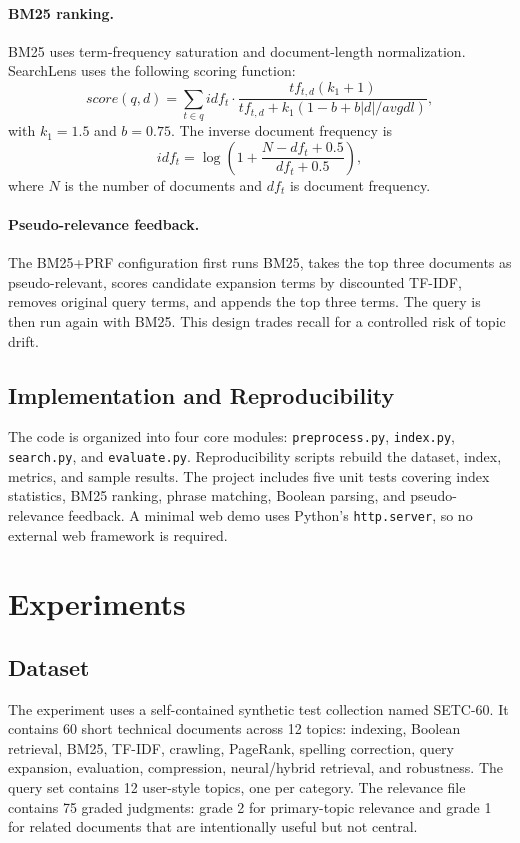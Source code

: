 \documentclass[sigconf,nonacm]{acmart}
\begin{document}
\paragraph{BM25 ranking.} BM25 uses term-frequency saturation and document-length normalization. SearchLens uses the following scoring function:
\begin{equation}
score(q,d)=\sum_{t \in q} idf_t \cdot \frac{tf_{t,d}(k_1+1)}{tf_{t,d}+k_1(1-b+b|d|/avgdl)},
\end{equation}
with $k_1=1.5$ and $b=0.75$. The inverse document frequency is
\begin{equation}
  idf_t = \log\left(1 + \frac{N - df_t + 0.5}{df_t + 0.5}\right),
\end{equation}
where $N$ is the number of documents and $df_t$ is document frequency.

\paragraph{Pseudo-relevance feedback.} The BM25+PRF configuration first runs BM25, takes the top three documents as pseudo-relevant, scores candidate expansion terms by discounted TF-IDF, removes original query terms, and appends the top three terms. The query is then run again with BM25. This design trades recall for a controlled risk of topic drift.

\subsection{Implementation and Reproducibility}
The code is organized into four core modules: \texttt{preprocess.py}, \texttt{index.py}, \texttt{search.py}, and \texttt{evaluate.py}. Reproducibility scripts rebuild the dataset, index, metrics, and sample results. The project includes five unit tests covering index statistics, BM25 ranking, phrase matching, Boolean parsing, and pseudo-relevance feedback. A minimal web demo uses Python's \texttt{http.server}, so no external web framework is required.

\section{Experiments}
\subsection{Dataset}
The experiment uses a self-contained synthetic test collection named SETC-60. It contains 60 short technical documents across 12 topics: indexing, Boolean retrieval, BM25, TF-IDF, crawling, PageRank, spelling correction, query expansion, evaluation, compression, neural/hybrid retrieval, and robustness. The query set contains 12 user-style topics, one per category. The relevance file contains 75 graded judgments: grade 2 for primary-topic relevance and grade 1 for related documents that are intentionally useful but not central.
\end{document}
